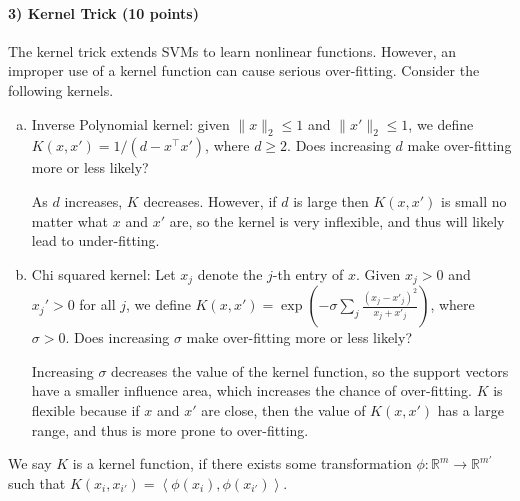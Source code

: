 \documentclass{article}
\begin{document}
\paragraph{3) Kernel Trick (10 points)}
The kernel trick extends SVMs to learn nonlinear functions. However, an improper use of a kernel function can cause serious over-fitting. Consider the following kernels.
\begin{enumerate}[(a)]
	\item Inverse Polynomial kernel: given $\|x\|_2\leq 1$ and $\|x'\|_2\leq 1$, we define $K(x, x') = 1/(d-x^\top x')$, where $d\geq 2$. Does increasing $d$ make over-fitting more or less likely?
		\begin{soln}
			As $d$ increases, $K$ decreases. However, if $d$ is large then $K(x, x')$ is small no matter what $x$ and $x'$ are, so the kernel is very inflexible, and thus will likely lead to under-fitting.
		\end{soln}

	\item Chi squared kernel: Let $x_j$ denote the $j$-th entry of $x$. Given $x_j>0$ and $x_j'>0$ for all $j$, we define $K(x, x') = \exp\left(-\sigma\sum_j\frac{(x_j-x'_j)^2}{x_j+x'_j}\right)$, where $\sigma>0$. Does increasing $\sigma$ make over-fitting more or less likely?
		\begin{soln}
			Increasing $\sigma$ decreases the value of the kernel function, so the support vectors have a smaller influence area, which increases the chance of over-fitting. $K$ is flexible because if $x$ and $x'$ are close, then the value of $K(x, x')$ has a large range, and thus is more prone to over-fitting.
		\end{soln}

\end{enumerate}
We say $K$ is a kernel function, if there exists some transformation $\phi:\mathbb{R}^m\rightarrow \mathbb{R}^{m'}$ such that $K(x_i,x_{i'}) = \left<\phi(x_i),\phi(x_{i'})\right>$.
\end{document}
